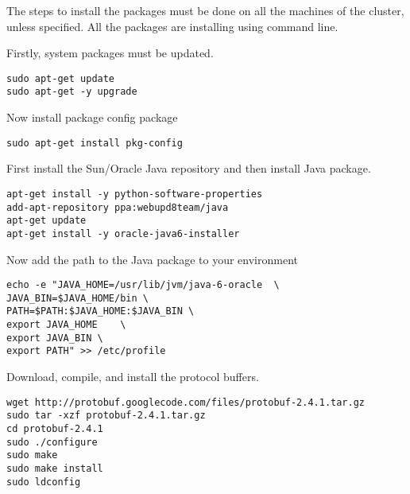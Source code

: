 \documentclass[11pt]{article}
\begin{document}

The steps to install the packages must be done on all the machines of
the cluster, unless specified. All the packages are installing using
command line.

Firstly, system packages must be updated.

\begin{verbatim}
sudo apt-get update
sudo apt-get -y upgrade 
\end{verbatim}

Now install package config package

\begin{verbatim}
sudo apt-get install pkg-config 
\end{verbatim}


First install the Sun/Oracle Java repository and then install Java
package.

\begin{verbatim}
apt-get install -y python-software-properties
add-apt-repository ppa:webupd8team/java
apt-get update
apt-get install -y oracle-java6-installer
\end{verbatim}

Now add the path to the Java package to your environment

\begin{verbatim}
echo -e "JAVA_HOME=/usr/lib/jvm/java-6-oracle  \
JAVA_BIN=$JAVA_HOME/bin \
PATH=$PATH:$JAVA_HOME:$JAVA_BIN \
export JAVA_HOME    \
export JAVA_BIN \
export PATH" >> /etc/profile
\end{verbatim}


Download, compile, and install the protocol buffers.

\begin{verbatim}
wget http://protobuf.googlecode.com/files/protobuf-2.4.1.tar.gz
sudo tar -xzf protobuf-2.4.1.tar.gz
cd protobuf-2.4.1
sudo ./configure
sudo make
sudo make install
sudo ldconfig
\end{verbatim}
\end{document}
